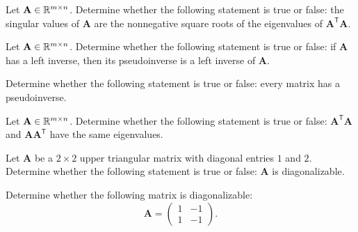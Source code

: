 \begin{problem}
Let $\mathbf A\in\mathbb{R}^{m\times n}$. Determine whether the following statement is true or false: the singular values of $\mathbf A$ are the nonnegative square roots of the eigenvalues of $\mathbf A^{\mathsf T}\mathbf A$.
\end{problem}

\begin{problem}
Let $\mathbf A\in\mathbb{R}^{m\times n}$. Determine whether the following statement is true or false: if $\mathbf A$ has a left inverse, then its pseudoinverse is a left inverse of $\mathbf A$.
\end{problem}

\begin{problem}
Determine whether the following statement is true or false: every matrix has a pseudoinverse.
\end{problem}

\begin{problem}
Let $\mathbf A\in\mathbb{R}^{m\times n}$. Determine whether the following statement is true or false: $\mathbf A^{\mathsf T}\mathbf A$ and $\mathbf A\mathbf A^{\mathsf T}$ have the same eigenvalues.
\end{problem}

\begin{problem}
Let $\mathbf A$ be a $2\times2$ upper triangular matrix with diagonal entries $1$ and $2$. Determine whether the following statement is true or false: $\mathbf A$ is diagonalizable.
\end{problem}

\begin{problem}
Determine whether the following matrix is diagonalizable:
\[
\mathbf A=
\begin{pmatrix}
1&-1\\
1&-1
\end{pmatrix}.
\]
\end{problem}

